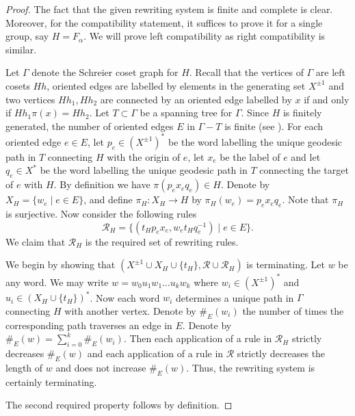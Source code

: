 \documentclass[12pt, a4paper]{amsart}
\theoremstyle{definition}
\begin{document}
\begin{proof}
The fact that the given rewriting system is finite and complete is clear. Moreover, for the compatibility statement, it suffices to prove it for a single group, say $H= F_{\alpha}$. We will prove left compatibility as right compatibility is similar.

Let $\Gamma$ denote the Schreier coset graph for $H$. Recall that the vertices of $\Gamma$ are left cosets $Hh$, oriented edges are labelled by elements in the generating set $X^{\pm1}$ and two vertices $Hh_1, Hh_2$ are connected by an oriented edge labelled by $x$ if and only if $Hh_1\pi(x) = Hh_2$. Let $T\subset \Gamma$ be a spanning tree for $\Gamma$. Since $H$ is finitely generated, the number of oriented edges $E$ in $\Gamma - T$ is finite (see \cite{St83}). For each oriented edge $e\in E$, let $p_e\in (X^{\pm1})^*$ be the word labelling the unique geodesic path in $T$ connecting $H$ with the origin of $e$, let $x_e$ be the label of $e$ and let $q_e\in X^*$ be the word labelling the unique geodesic path in $T$ connecting the target of $e$ with $H$. By definition we have $\pi(p_ex_eq_e)\in H$. Denote by $X_H = \{w_e \mid e\in E\}$, and define $\pi_H\colon X_H\to H$ by $\pi_H(w_e) = p_ex_eq_e$. Note that $\pi_H$ is surjective. Now consider the following rules
\[
\mathcal{R}_H = \{(t_Hp_ex_e, w_et_Hq_e^{-1}) \mid e\in E\}.
\]
We claim that $\mathcal{R}_H$ is the required set of rewriting rules. 

We begin by showing that $(X^{\pm1}\cup X_H\cup\{t_H\}, \mathcal{R}\cup\mathcal{R}_H)$ is terminating. Let $w$ be any word. We may write $w = w_0u_1w_1\ldots u_kw_k$ where $w_i\in (X^{\pm1})^*$ and $u_i\in (X_H\cup \{t_H\})^*$. Now each word $w_i$ determines a unique path in $\Gamma$ connecting $H$ with another vertex. Denote by $\#_E(w_i)$ the number of times the corresponding path traverses an edge in $E$. Denote by $\#_E(w) = \sum_{i=0}^k\#_E(w_i)$. Then each application of a rule in $\mathcal{R}_H$ strictly decreases $\#_E(w)$ and each application of a rule in $\mathcal{R}$ strictly decreases the length of $w$ and does not increase $\#_E(w)$. Thus, the rewriting system is certainly terminating.

The second required property follows by definition. 


\end{proof}
\end{document}

